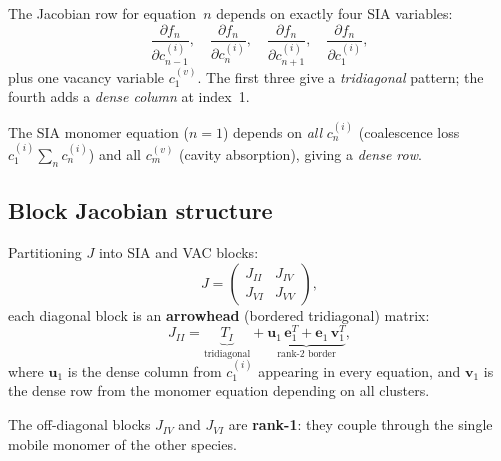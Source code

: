 \documentclass[11pt]{article}
\begin{document}
The Jacobian row for equation~$n$ depends on exactly four SIA
variables:
\begin{equation}
  \frac{\partial f_{n}}{\partial c_{n-1}^{(i)}},\quad
  \frac{\partial f_{n}}{\partial c_{n}^{(i)}},\quad
  \frac{\partial f_{n}}{\partial c_{n+1}^{(i)}},\quad
  \frac{\partial f_{n}}{\partial c_{1}^{(i)}},
  \label{eq:mono_deps}
\end{equation}
plus one vacancy variable $c_{1}^{(v)}$.
The first three give a \emph{tridiagonal} pattern; the fourth adds a
\emph{dense column} at index~1.

The SIA monomer equation ($n = 1$) depends on \emph{all}
$c_{n}^{(i)}$ (coalescence loss $c_{1}^{(i)}\!\sum_{n} c_{n}^{(i)}$)
and all $c_{m}^{(v)}$ (cavity absorption), giving a \emph{dense row}.

\subsection{Block Jacobian structure}

Partitioning $J$ into SIA and VAC blocks:
\begin{equation}
  J =
  \begin{pmatrix}
    J_{II} & J_{IV} \\
    J_{VI} & J_{VV}
  \end{pmatrix},
  \label{eq:block_mono}
\end{equation}
each diagonal block is an \textbf{arrowhead} (bordered tridiagonal) matrix:
\begin{equation}
  J_{II} = \underbrace{T_{I}}_{\text{tridiagonal}}
  + \underbrace{\mathbf{u}_{1}\,\mathbf{e}_{1}^{T}
  + \mathbf{e}_{1}\,\mathbf{v}_{1}^{T}}_{\text{rank-2 border}},
  \label{eq:arrowhead}
\end{equation}
where $\mathbf{u}_{1}$ is the dense column from $c_{1}^{(i)}$ appearing
in every equation, and $\mathbf{v}_{1}$ is the dense row from the
monomer equation depending on all clusters.

The off-diagonal blocks $J_{IV}$ and $J_{VI}$ are \textbf{rank-1}:
they couple through the single mobile monomer of the other species.
\end{document}
